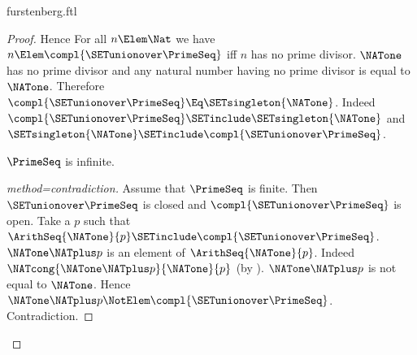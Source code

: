 \documentclass{stex}
\begin{document}
\begin{smodule}{furstenberg.ftl}
\begin{forthel}
\begin{proof}
    Hence For all $n \Elem \Nat$ we have $n \Elem \compl{\SETunionover \PrimeSeq}$ iff
    $n$ has no prime divisor.
    $\NATone$ has no prime divisor and any natural number having no prime
    divisor is equal to $\NATone$.
    Therefore $\compl{\SETunionover \PrimeSeq} \Eq \SETsingleton{\NATone}$.
    Indeed $\compl{\SETunionover \PrimeSeq} \SETinclude \SETsingleton{\NATone}$ and $\SETsingleton{\NATone}
    \SETinclude \compl{\SETunionover \PrimeSeq}$.

    $\PrimeSeq$ is infinite.
    \begin{proof}[method=contradiction]
      Assume that $\PrimeSeq$ is finite.
      Then $\SETunionover \PrimeSeq$ is closed and $\compl{\SETunionover \PrimeSeq}$ is open.
      Take a $p$ such that $\ArithSeq{\NATone}{p} \SETinclude \compl{\SETunionover \PrimeSeq}$.
      $\NATone \NATplus p$ is an element of $\ArithSeq{\NATone}{p}$.
      Indeed $\NATcong{\NATone \NATplus p}{\NATone}{p}$
      (by ).
      $\NATone \NATplus p$ is not equal to $\NATone$.
      Hence $\NATone \NATplus p \NotElem \compl{\SETunionover \PrimeSeq}$.
      Contradiction.
    \end{proof}
  \end{proof}
\end{forthel}

\printbibliography
{}
\end{smodule}
\end{document}
